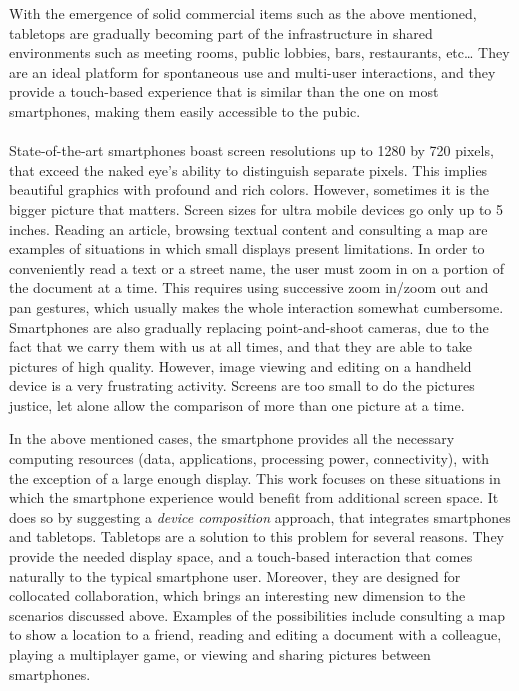 With the emergence of solid commercial items such as the above mentioned, tabletops are gradually becoming part of the infrastructure in shared environments such as meeting rooms, public lobbies, bars, restaurants, etc\ldots
They are an ideal platform for spontaneous use and multi-user interactions, and they provide a touch-based experience that is similar than the one on most smartphones, making them easily accessible to the pubic.
\\\\
State-of-the-art smartphones boast screen resolutions up to 1280 by 720 pixels, that exceed the naked eye's ability to distinguish separate pixels.
This implies beautiful graphics with profound and rich colors.
However, sometimes it is the bigger picture that matters.
Screen sizes for ultra mobile devices go only up to 5 inches.
Reading an article, browsing textual content and consulting a map are examples of situations in which small displays present limitations.
In order to conveniently read a text or a street name, the user must zoom in on a portion of the document at a time.
This requires using successive zoom in/zoom out and pan gestures, which usually makes the whole interaction somewhat cumbersome.
Smartphones are also gradually replacing point-and-shoot cameras, due to the fact that we carry them with us at all times, and that they are able to take pictures of high quality.
However, image viewing and editing on a handheld device is a very frustrating activity.
Screens are too small to do the pictures justice, let alone allow the comparison of more than one picture at a time.

In the above mentioned cases, the smartphone provides all the necessary computing resources (data, applications, processing power, connectivity), with the exception of a large enough display.
This work focuses on these situations in which the smartphone experience would benefit from additional screen space.
It does so by suggesting a \emph{device composition} approach, that integrates smartphones and tabletops.
Tabletops are a solution to this problem for several reasons.
They provide the needed display space, and a touch-based interaction that comes naturally to the typical smartphone user.
Moreover, they are designed for collocated collaboration, which brings an interesting new dimension to the scenarios discussed above.
Examples of the possibilities include consulting a map to show a location to a friend, reading and editing a document with a colleague, playing a multiplayer game, or viewing and sharing pictures between smartphones.

